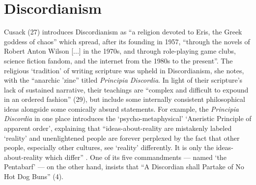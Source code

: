\documentclass[Draft.tex]{subfiles}
\begin{document}
\section*{Discordianism}
Cusack (27) introduces Discordianism as
``a religion devoted to Eris, the Greek goddess of chaos''
which spread, after its founding in 1957, ``through
the novels of Robert Anton Wilson [...] in the 1970s,
and through role-playing game clubs, science fiction fandom,
and the internet from the 1980s to the present''.
The religious `tradition' of writing scripture was upheld in Discordianism,
she notes, with the ``anarchic 'zine'' titled \textit{Principia Discordia}.
In light of their scripture's lack of sustained narrative, their teachings
are ``complex and difficult to expound in an ordered fashion'' (29),
but include some internally consistent philosophical ideas
alongside some comically absurd statements.
For example, the \textit{Principia Discordia} in one place introduces the
`psycho-metaphysical' `Aneristic Principle of apparent order',
explaining that ``ideas-about-reality are mistakenly labeled `reality'
and unenlightened people are forever perplexed by the fact that
other people, especially other cultures, see `reality' differently.
It is only the ideas-about-reality which differ'' \parencite[49]{Principia}.
One of its five commandments --- named `the Pentabarf' ---
on the other hand, insists that
``A Discordian shall Partake of No Hot Dog Buns'' (4).
\end{document}
